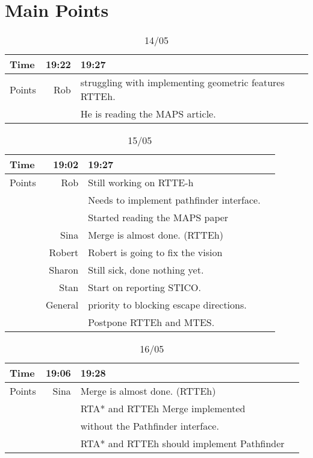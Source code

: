 \documentclass{article}
\begin{document}
	\section{Main Points}
		\begin{table}[h!]
			\caption{14/05}
			\begin{tabularx}{\textwidth}{l|rlX}
			\hline
		
			\hline
			Time 	& 19:22 & 19:27 &\\\hline
			Points 	& Rob 	&  struggling with implementing geometric features RTTEh.&\\
					&		&	He is reading the MAPS article.&\\
			\hline
		
			\hline
			\end{tabularx}
		\end{table}
		\begin{table}[h!]
			\caption{15/05}
			\begin{tabularx}{\textwidth}{l|rlX}
			\hline
		
			\hline
			Time 	& 19:02 & 19:27 &\\\hline
			Points 	& Rob 	&	Still working on RTTE-h&\\
					&		&	Needs to implement pathfinder interface.&\\
					&		&	Started reading the MAPS paper&\\
					& Sina	&	Merge is almost done. (RTTEh)&\\
					& Robert&	Robert is going to fix the vision&\\
					& Sharon&	Still sick, done nothing yet.&\\
					& Stan	&	Start on reporting STICO.&\\
					&General&	priority to blocking escape directions.&\\
					&		&	Postpone RTTEh and MTES.&\\
			\hline
		
			\hline
			\end{tabularx}
		\end{table}
		\begin{table}[h!]
		\caption{16/05}
			\begin{tabularx}{\textwidth}{l|rlX}
			\hline
		
			\hline
			Time 	& 19:06 & 19:28 &\\\hline
			Points 	& Sina	&	Merge is almost done. (RTTEh)&\\
					& 		&	RTA* and RTTEh Merge implemented &\\
					&		&	without the Pathfinder interface. &\\
					&		&	 RTA* and RTTEh should implement Pathfinder&\\
			\hline
		
			\hline
			\end{tabularx}
		\end{table}
\end{document}
